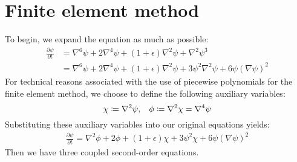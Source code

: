 \documentclass[reqno]{article}
\begin{document}
\section{Finite element method}
To begin, we expand the equation as much as possible:
\begin{equation}
    \begin{split}
        \frac{\partial \psi}{\partial t}
        &=
        \nabla^6 \psi
        + 2 \nabla^4 \psi
        + \left(1 + \epsilon \right) \nabla^2 \psi
        + \nabla^2 \psi^3 \\
        &=
        \nabla^6 \psi
        + 2 \nabla^4 \psi
        + \left(1 + \epsilon \right) \nabla^2 \psi
        + 3 \psi^2 \nabla^2 \psi
        + 6 \psi \left( \nabla \psi \right)^2
    \end{split}
\end{equation}
For technical reasons associated with the use of piecewise polynomials for the finite element method, we choose to define the following auxiliary variables:
\begin{equation}
    \chi \coloneqq \nabla^2 \psi, \hspace{0.3cm}
    \phi \coloneqq \nabla^2 \chi = \nabla^4 \psi
\end{equation}
Substituting these auxiliary variables into our original equations yields:
\begin{equation} \label{eq:expanded-phase-field}
    \begin{split}
        \frac{\partial \psi}{\partial t}
        =
        \nabla^2 \phi
        + 2 \phi
        + \left(1 + \epsilon \right) \chi
        + 3 \psi^2 \chi
        + 6 \psi \left(\nabla \psi \right)^2
    \end{split}
\end{equation}
Then we have three coupled second-order equations.
\end{document}
